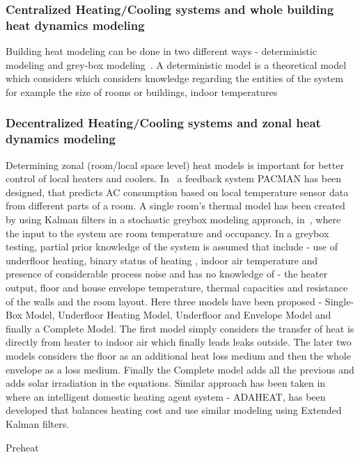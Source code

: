 \documentclass{sig-alternate}
\begin{document}
\subsubsection{Centralized Heating/Cooling systems and whole building heat dynamics modeling}

\indent Building heat modeling can be done in two different ways - deterministic modeling and grey-box modeling~\cite{Model}. A deterministic model is a theoretical model which considers which considers knowledge regarding the entities of the system for example the size of rooms or buildings, indoor temperatures 



\subsubsection{Decentralized Heating/Cooling systems and zonal heat dynamics modeling}

\indent Determining zonal (room/local space level) heat models is important for better control of local heaters and coolers. In~\cite{HomeAC} a feedback system PACMAN has been designed, that predicts AC consumption based on local temperature sensor data from different parts of a room. A single room's thermal model has been created by using Kalman filters in a stochastic greybox modeling approach, in~\cite{Kalman}, where the input to the system are room temperature and occupancy. In a greybox testing, partial prior knowledge of the system is assumed that include - use of underfloor heating, binary status of heating , indoor air temperature and presence of considerable process noise and has no knowledge of - the heater output, floor and house envelope temperature, thermal capacities and resistance of the walls and the room layout. Here three models have been proposed - Single-Box Model, Underfloor Heating Model, Underfloor and Envelope Model and finally a Complete Model. The first model simply considers the transfer of heat is directly from heater to indoor air which finally leads leaks outside. The later two models considers the floor as an additional heat loss medium and then the whole envelope as a loss medium. Finally the Complete model adds all the previous and adds solar irradiation in the equations. Similar approach has been taken in~\cite{AdaHeat} where an intelligent domestic heating agent system - ADAHEAT, has been developed that balances heating cost and use similar modeling using Extended Kalman filters. 
 

Preheat 
\end{document}
